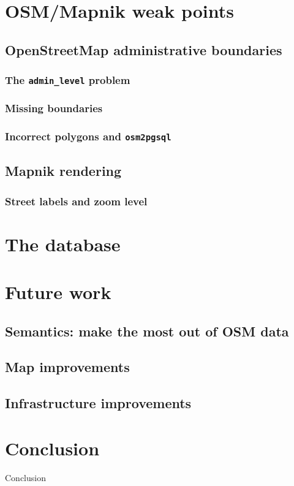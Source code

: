 \documentclass{beamer}
\begin{document}
\section{OSM/Mapnik weak points}
\subsection{OpenStreetMap administrative boundaries}
\subsubsection{The {\tt admin\_level} problem}
\subsubsection{Missing boundaries}
\subsubsection{Incorrect polygons and {\tt osm2pgsql}}

\subsection{Mapnik rendering}
\subsubsection{Street labels and zoom level}

\section{The database}

\section{Future work}
\subsection{Semantics: make the most out of OSM data}
\subsection{Map improvements}
\subsection{Infrastructure improvements}

\section{Conclusion}
\begin{frame}[t]{Conclusion}
\end{frame}
\end{document}
